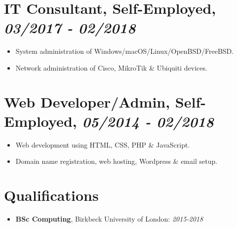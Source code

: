 \documentclass[letterpaper]{article}
\begin{document}
\section{IT Consultant, Self-Employed, \emph{03/2017 - 02/2018}}
\label{sec:org1471706}

\begin{itemize}
\item System administration of Windows/macOS/Linux/OpenBSD/FreeBSD.
\item Network administration of Cisco, MikroTik \& Ubiquiti devices.
\end{itemize}

\section{Web Developer/Admin, Self-Employed, \emph{05/2014 - 02/2018}}
\label{sec:org8f8c080}

\begin{itemize}
\item Web development using HTML, CSS, PHP \& JavaScript.
\item Domain name registration, web hosting, Wordpress \& email setup.
\end{itemize}

\section{Qualifications}
\label{sec:orgfeee579}

\begin{itemize}
\item \textbf{BSc Computing}, Birkbeck University of London: \emph{2015-2018}
\end{itemize}
\end{document}
